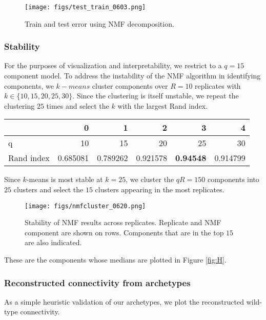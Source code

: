 \begin{figure}[H]
    \centering
    \texttt{[image: figs/test\_train\_0603.png]} 
    \label{fig:train_test}
    \caption{Train and test error using NMF decomposition.}
\end{figure}

\newpage

\subsubsection{Stability}

For the purposes of visualization and interpretability, we restrict to a $q = 15$ component model.
To address the instability of the NMF algorithm in identifying components, we $k-means$ cluster components over $R = 10$ replicates with $k \in \{10,15,20, 25, 30\}$.
Since the clustering is itself unstable, we repeat the clustering $25$ times and select the $k$ with the largest Rand index.

\begin{table}[H]
\begin{tabular}{lrrrrr}
\toprule
{} &          0 &          1 &          2 &         3 &          4 \\
\midrule
q          &  10 &  15 &  20 &  25 &  30 \\
Rand index &   0.685081 &   0.789262 &   0.921578 &   \textbf{0.94548} &   0.914799 \\
\bottomrule
\end{tabular}
\end{table}

Since $k$-means is most stable at $k=25$, we cluster the $qR = 150$ components into $25$ clusters and select the $15$ clusters appearing in the most replicates.
\begin{figure}[H]
    \centering
    \texttt{[image: figs/nmfcluster\_0620.png]} 
    \label{fig:distances}
    \caption{Stability of NMF results across replicates. 
    Replicate and NMF component are shown on rows.
    Components that are in the top $15$ are also indicated.}
\end{figure}
These are the components whose medians are plotted in Figure \ref{fig:H}.


\newpage

\subsubsection{Reconstructed connectivity from archetypes}
As a simple heuristic validation of our archetypes, we plot the reconstructed wild-type connectivity.

